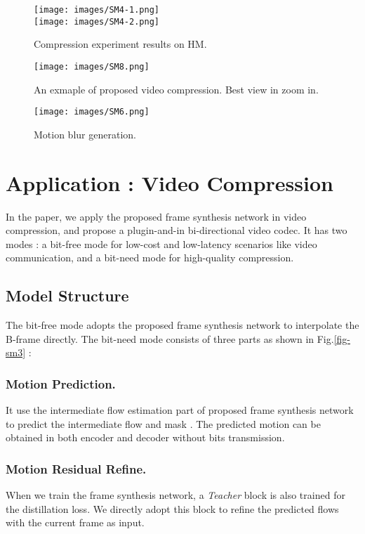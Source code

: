 \documentclass[sigconf]{acmart}
\begin{document}
\begin{figure}[h]
    \centering
    \texttt{[image: images/SM4-1.png]}\\
    \texttt{[image: images/SM4-2.png]}
    \caption{Compression experiment results on HM.}
    \label{fig-sm5}
\end{figure}

\begin{figure}[h]
    \centering
    \texttt{[image: images/SM8.png]}
    \caption{An exmaple of proposed video compression. Best view in zoom in.}
    \label{fig-sm8}
\end{figure}

\begin{figure}[h]
    \centering
    \texttt{[image: images/SM6.png]}
    \caption{Motion blur generation.}
    \label{fig-sm6}
\end{figure}

\section{Application :  Video Compression}

In the paper, we apply the proposed frame synthesis network in video compression, and propose a plugin-and-in bi-directional video codec. It has two modes : a bit-free mode for low-cost and low-latency scenarios like video communication, and a bit-need mode for high-quality compression.

\subsection{Model Structure}

The bit-free mode adopts the proposed frame synthesis network to interpolate the B-frame directly. The bit-need mode consists of three parts as shown in Fig.\ref{fig-sm3} : 

\subsubsection{Motion Prediction.} It use the intermediate flow estimation part of proposed frame synthesis network to predict the intermediate flow and mask . The predicted motion can be obtained in both encoder and decoder without bits transmission.

\subsubsection{Motion Residual Refine.} When we train the frame synthesis network, a \textit{Teacher} block is also trained for the distillation loss. We directly adopt this block to refine the predicted flows with the current frame as input.
\end{document}
